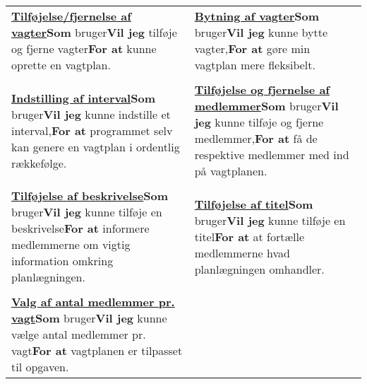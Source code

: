\begin{tabular}{p{2.5in}p{2.5in}}
\textbf{\underline{Tilføjelse/fjernelse af vagter}}\newline \textbf{Som} bruger\newline \textbf{Vil jeg} tilføje og fjerne vagter\newline \textbf{For at} kunne oprette en vagtplan. & 

\textbf{\underline{Bytning af vagter}}\newline \textbf{Som} bruger\newline \textbf{Vil jeg} kunne bytte vagter,\newline \textbf{For at} gøre min vagtplan mere fleksibelt.  \\\\

\textbf{\underline{Indstilling af interval}}\newline \textbf{Som} bruger\newline \textbf{Vil jeg} kunne indstille et interval,\newline \textbf{For at} programmet selv kan genere en vagtplan i ordentlig rækkefølge.  & 

\textbf{\underline{Tilføjelse og fjernelse af medlemmer}}\newline \textbf{Som} bruger\newline \textbf{Vil jeg} kunne tilføje og fjerne medlemmer,\newline \textbf{For at} få de respektive medlemmer med ind på vagtplanen.  \\\\  

\textbf{\underline{Tilføjelse af beskrivelse}}\newline \textbf{Som} bruger\newline \textbf{Vil jeg} kunne tilføje en beskrivelse\newline \textbf{For at} informere medlemmerne om vigtig information omkring planlægningen.  &

\textbf{\underline{Tilføjelse af titel}}\newline \textbf{Som} bruger\newline \textbf{Vil jeg} kunne tilføje en titel\newline \textbf{For at} at fortælle medlemmerne hvad planlægningen omhandler.  \\\\

\textbf{\underline{Valg af antal medlemmer pr. vagt}}\newline \textbf{Som} bruger\newline \textbf{Vil jeg} kunne vælge antal medlemmer pr. vagt\newline \textbf{For at} vagtplanen er tilpasset til opgaven.  &


\end{tabular}
